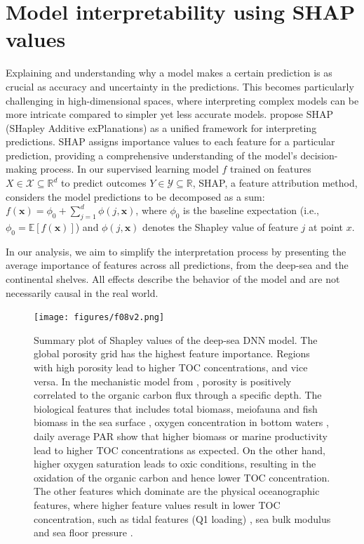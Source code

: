 \documentclass[journal abbreviation, manuscript]{copernicus}
\begin{document}
\newpage
\section{Model interpretability using SHAP values}
\label{appendix:shap}
Explaining and understanding why a model makes a certain prediction is as crucial as accuracy and uncertainty in the predictions. This becomes particularly challenging in high-dimensional spaces, where interpreting complex models can be more intricate compared to simpler yet less accurate models. \cite{lundberg2017shap} propose SHAP (SHapley Additive exPlanations) as a unified framework for interpreting predictions. SHAP assigns importance values to each feature for a particular prediction, providing a comprehensive understanding of the model's decision-making process. In our supervised learning model $f$ trained on features $X \in \mathcal{X} \subseteq \mathbb{R}^d$ to predict outcomes $Y \in \mathcal{Y} \subseteq \mathbb{R}$, SHAP, a feature attribution method, considers the model predictions to be decomposed as a sum: $f (\mathbf{x}) = \phi_0 + \sum_{j=1}^{d} \phi (j, \mathbf{x})$, where $\phi_0$ is the baseline expectation (i.e., $\phi_0 = \mathbb{E}[f (\mathbf{x})]$) and $\phi (j, \mathbf{x})$ denotes the Shapley value of feature $j$ at point $x$. 


In our analysis, we aim to simplify the interpretation process by presenting the average importance of features across all predictions, from the deep-sea and the continental shelves. All effects describe the behavior of the model and are not necessarily causal in the real world. 

\begin{figure}[!htb]
\texttt{[image: figures/f08v2.png]}
\caption{Summary plot of Shapley values of the deep-sea DNN model. The global porosity grid \citep{Martin2005Porosity} has the highest feature importance. Regions with high porosity lead to higher TOC concentrations, and vice versa. In the mechanistic model from \cite{Bradley2022}, porosity is positively correlated to the organic carbon flux through a specific depth. The biological features that includes total biomass, meiofauna and fish biomass in the sea surface \citep{WEI2010}, oxygen concentration in bottom waters \citep{WOA13X2013}, daily average PAR \citep{nasaaqua} show that higher biomass or marine productivity lead to higher TOC concentrations as expected. On the other hand, higher oxygen saturation leads to oxic conditions, resulting in the oxidation of the organic carbon and hence lower TOC concentration. The other features which dominate are the physical oceanographic features, where higher feature values result in lower TOC concentration, such as tidal features (Q1 loading) \citep{HartDavis2021EOT20}, sea bulk modulus \citep{WOA13X2013} and sea floor pressure \citep{WOA13X2013}.}
\label{fig:shap_do}
\end{figure}
\end{document}
